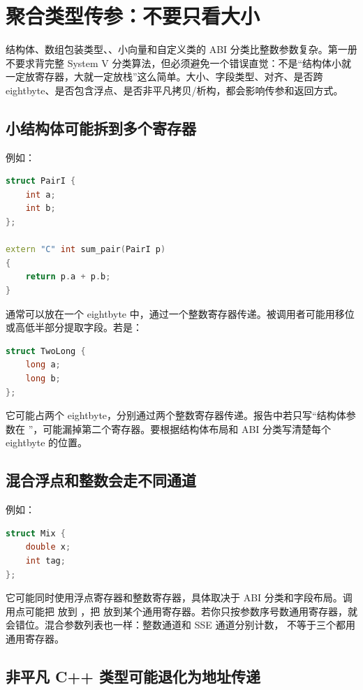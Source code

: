 \section{聚合类型传参：不要只看大小}

结构体、数组包装类型、、小向量和自定义类的 ABI 分类比整数参数复杂。第一册不要求背完整 System V 分类算法，但必须避免一个错误直觉：不是“结构体小就一定放寄存器，大就一定放栈”这么简单。大小、字段类型、对齐、是否跨 eightbyte、是否包含浮点、是否非平凡拷贝/析构，都会影响传参和返回方式。

\subsection{小结构体可能拆到多个寄存器}

例如：

\begin{lstlisting}[language=C++]
struct PairI {
    int a;
    int b;
};

extern "C" int sum_pair(PairI p)
{
    return p.a + p.b;
}
\end{lstlisting}

 通常可以放在一个 eightbyte 中，通过一个整数寄存器传递。被调用者可能用移位或高低半部分提取字段。若是：

\begin{lstlisting}[language=C++]
struct TwoLong {
    long a;
    long b;
};
\end{lstlisting}

它可能占两个 eightbyte，分别通过两个整数寄存器传递。报告中若只写“结构体参数在 ”，可能漏掉第二个寄存器。要根据结构体布局和 ABI 分类写清楚每个 eightbyte 的位置。

\subsection{混合浮点和整数会走不同通道}

例如：

\begin{lstlisting}[language=C++]
struct Mix {
    double x;
    int tag;
};
\end{lstlisting}

它可能同时使用浮点寄存器和整数寄存器，具体取决于 ABI 分类和字段布局。调用点可能把  放到 ，把  放到某个通用寄存器。若你只按参数序号数通用寄存器，就会错位。混合参数列表也一样：整数通道和 SSE 通道分别计数， 不等于三个都用通用寄存器。

\subsection{非平凡 C++ 类型可能退化为地址传递}

